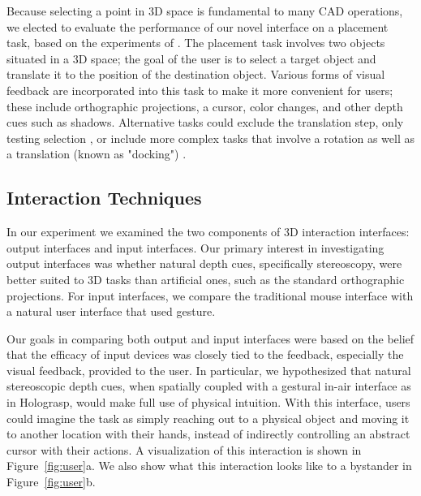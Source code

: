\documentclass[pageno]{jpaper}
\begin{document}
Because selecting a point in 3D space is fundamental to many CAD operations, we elected to
evaluate the performance of our novel interface on a placement task, based on the experiments
of \cite{study1, study2}. The placement task involves two objects situated in a 3D space; the
goal of the user is to select a target object and translate it to the position of the
destination object. Various forms of visual feedback are incorporated into this task to
make it more convenient for users; these include orthographic projections, a cursor, color
changes, and other depth cues such as shadows. Alternative tasks could exclude the
translation step, only testing selection \cite{holodesk}, or include more complex tasks
that involve a rotation as well as a translation (known as "docking") \cite{masliah2000measuring}.

\subsection{Interaction Techniques}
In our experiment we examined the two components of 3D interaction interfaces: output interfaces and
input interfaces. Our primary interest in investigating output interfaces was whether natural depth cues,
specifically stereoscopy, were better suited to 3D tasks than artificial ones, such as the
standard orthographic projections. For input interfaces, we compare the traditional
mouse interface with a natural user interface that used gesture.

Our goals in comparing both output and input interfaces were based on the belief that the
efficacy of input devices was closely tied to the feedback, especially the visual feedback, provided to the user.
In particular, we hypothesized that natural stereoscopic
depth cues, when spatially coupled with a gestural in-air interface as in Holograsp, would make full use of
physical intuition. With this interface, users could imagine the task as simply reaching
out to a physical object and moving it to another location with their hands, instead of
indirectly controlling an abstract cursor with their actions. A visualization of this interaction is shown in Figure~\ref{fig:user}a.
We also show what this interaction looks like to a bystander in Figure~\ref{fig:user}b.
\end{document}

